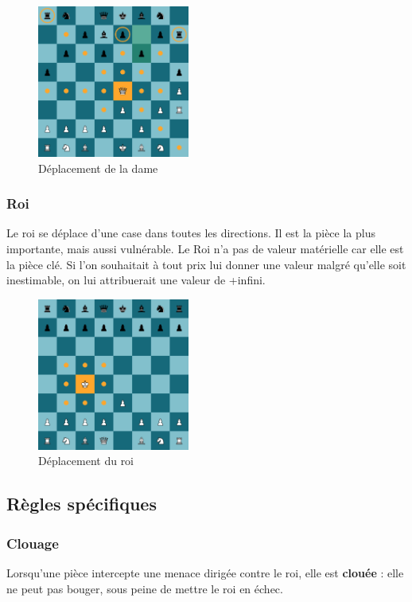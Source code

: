 \documentclass{article}
\begin{document}
\begin{figure}[h]
    \centering
    \includegraphics[width=\textwidth,height=5.0cm,keepaspectratio]{dameMove.png}
    \caption{Déplacement de la dame}
\end{figure}

\subsubsection*{Roi}
Le roi se déplace d'une case dans toutes les directions. Il est la pièce la plus importante, mais aussi vulnérable. Le Roi n'a pas de valeur 
matérielle car elle est la pièce clé. Si l'on souhaitait à tout prix lui donner une valeur malgré qu'elle soit inestimable, on lui attribuerait
une valeur de +infini.

\begin{figure}[h]
    \centering
    \includegraphics[width=\textwidth,height=5.0cm,keepaspectratio]{roiMove.png}
    \caption{Déplacement du roi}
\end{figure}

\subsection{Règles spécifiques}

\subsubsection*{Clouage}
Lorsqu'une pièce intercepte une menace dirigée contre le roi, elle est \textbf{clouée} : elle ne peut pas bouger, sous peine de mettre le roi en échec.
\end{document}
